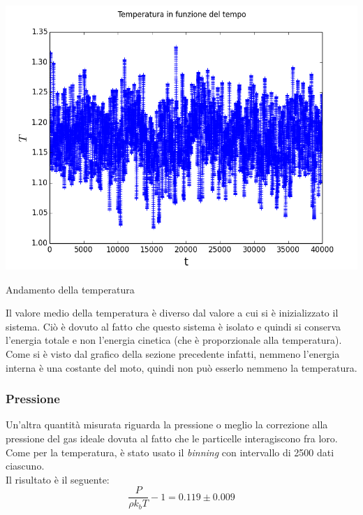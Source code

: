 \begin{myfig}[h]
\includegraphics[scale=0.55]{soft_core/10_temp.png}
\caption{Andamento della temperatura}
\end{myfig}
Il valore medio della temperatura è diverso dal valore a cui si è inizializzato il sistema. Ciò è dovuto al fatto che questo sistema è isolato e quindi si conserva l'energia totale e non l'energia cinetica (che è proporzionale alla temperatura).
Come si è visto dal grafico della sezione precedente infatti, nemmeno l'energia interna è una costante del moto, quindi non può esserlo nemmeno la temperatura.\\

\subsubsection{Pressione}
Un'altra quantità misurata riguarda la pressione o meglio la correzione alla pressione del gas ideale dovuta al fatto che le particelle interagiscono fra loro.
Come per la temperatura, è stato usato il \emph{binning} con intervallo di 2500 dati ciascuno.\\
Il risultato è il seguente:
$$
	\frac{P}{\rho k_b T} - 1 = 0.119 \pm 0.009
$$ 

